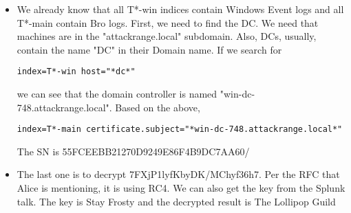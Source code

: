 \begin{itemize}
\item We already know that all T*-win indices contain Windows Event logs and all T*-main contain Bro logs. First, we need to find the DC. We need that machines are in the "attackrange.local" subdomain. Also, DCs, usually, contain the name "DC" in their Domain name. If we search for \begin{verbatim}
index=T*-win host="*dc*"
\end{verbatim}
we can see that the domain controller is named "win-dc-748.attackrange.local". Based on the above, \begin{verbatim}
index=T*-main certificate.subject="*win-dc-748.attackrange.local*"
\end{verbatim}
The SN is 55FCEEBB21270D9249E86F4B9DC7AA60/
\item The last one is to decrypt 7FXjP1lyfKbyDK/MChyf36h7. Per the RFC that Alice is mentioning, it is using RC4. We can also get the key from the Splunk talk. The key is Stay Frosty and the decrypted result is The Lollipop Guild
\end{itemize}

